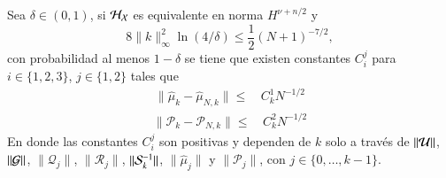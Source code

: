 \begin{teo}
    Sea $\delta \in (0, 1)$, si $\H_\X$ es equivalente en norma $H^{\nu + n/2}$ y
    \[
    8\|k\|^2_\infty \ln(4/\delta) \leq \frac{1}{2} (N+1)^{-7/2},
    \]
    con probabilidad al menos $1 - \delta$ se tiene que existen constantes $C_i^j$ para $i \in \{1, 2, 3\}$, $j \in \{1, 2\}$ tales que
	\begin{equation*}
		\begin{aligned}
			\| \hat \mu_{k} - \hat \mu_{N,k}  \| \leq & \, C_{k}^1 N^{-1/2}
		\end{aligned}
	\end{equation*}
	\begin{equation*}
		\begin{aligned}
			\| \mathcal{P}_{k} - \mathcal{P}_{N,k}  \| \leq & \, C_{k}^2 N^{-1/2} 
		\end{aligned}
	\end{equation*}
	En donde las constantes $C_i^j$ son positivas y dependen de $k$ solo a través de $\| \U \| $, $\| \G \| $, $\| \mathcal{Q}_{j} \| $, $\| \mathcal{R}_{j} \| $, $\| \S_{k}^{-1} \| $, $\| \hat{\mu}_{j} \| $ y $\| \mathcal{P}_{j} \| $, con $j \in \{ 0, \dots, k-1\}$.
    \label{teo:teo_kerKKF_2}
\end{teo}

